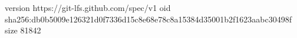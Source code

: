 version https://git-lfs.github.com/spec/v1
oid sha256:db0b5009e126321d0f7336d15c8e68e78c8a15384d35001b2f1623aabc30498f
size 81842
